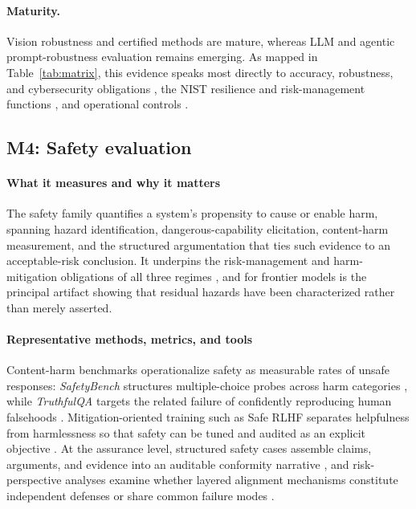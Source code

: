 \paragraph{Maturity.} Vision robustness and certified methods are mature, whereas LLM and agentic prompt-robustness evaluation remains emerging. As mapped in Table~\ref{tab:matrix}, this evidence speaks most directly to accuracy, robustness, and cybersecurity obligations \cite{euaiact2024}, the NIST resilience and risk-management functions \cite{nist2023airmf}, and operational controls \cite{iso42001}.

\subsection{M4: Safety evaluation}

\paragraph{What it measures and why it matters} The safety family quantifies a system's propensity to cause or enable harm, spanning hazard identification, dangerous-capability elicitation, content-harm measurement, and the structured argumentation that ties such evidence to an acceptable-risk conclusion. It underpins the risk-management and harm-mitigation obligations of all three regimes \cite{nist2023airmf,euaiact2024,iso42001}, and for frontier models is the principal artifact showing that residual hazards have been characterized rather than merely asserted.

\paragraph{Representative methods, metrics, and tools} Content-harm benchmarks operationalize safety as measurable rates of unsafe responses: \textit{SafetyBench} structures multiple-choice probes across harm categories \cite{wang2023safetybench}, while \textit{TruthfulQA} targets the related failure of confidently reproducing human falsehoods \cite{lin2021truthfulqa}. Mitigation-oriented training such as Safe RLHF separates helpfulness from harmlessness so that safety can be tuned and audited as an explicit objective \cite{dai2024saferlhf}. At the assurance level, structured safety cases assemble claims, arguments, and evidence into an auditable conformity narrative \cite{hawkins2025safetycaseai}, and risk-perspective analyses examine whether layered alignment mechanisms constitute independent defenses or share common failure modes \cite{gal2025alignment}.

